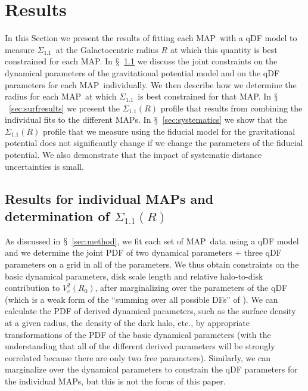 \documentclass{emulateapj}
\newcommand{\sectionname}{$\mathsection$}
\newcommand{\map}{MAP}
\newcommand{\sigoneone}{\ensuremath{\Sigma_{1.1}}}
\begin{document}
\section{Results}\label{sec:results}

In this Section we present the results of fitting each \map\ with a
qDF model to measure \sigoneone\ at the Galactocentric radius $R$ at
which this quantity is best constrained for each \map. In
\sectionname~\ref{sec:indivresults} we discuss the joint constraints
on the dynamical parameters of the gravitational potential model and
on the qDF parameters for each \map\ individually. We then describe
how we determine the radius for each \map\ at which \sigoneone\ is
best constrained for that \map. In \sectionname~\ref{sec:surfresults}
we present the $\sigoneone(R)$ profile that results from combining the
individual fits to the different \map s. In
\sectionname~\ref{sec:systematics} we show that the $\sigoneone(R)$
profile that we measure using the fiducial model for the gravitational
potential does not significantly change if we change the parameters of
the fiducial potential. We also demonstrate that the impact of
systematic distance uncertainties is small.

\subsection{Results for individual \map s and determination of $\Sigma_{1.1}(R)$}\label{sec:indivresults}

As discussed in \sectionname~\ref{sec:method}, we fit each set of
\map\ data using a qDF model and we determine the joint PDF of two
dynamical parameters + three qDF parameters on a grid in all of the
parameters. We thus obtain constraints on the basic dynamical
parameters, disk scale length and relative halo-to-disk contribution
to $V_c^2(R_0)$, after marginalizing over the parameters of the qDF
(which is a weak form of the ``summing over all possible DFs'' of
\citet{Magorrian06a}). We can calculate the PDF of derived dynamical
parameters, such as the surface density at a given radius, the density
of the dark halo, etc., by appropriate transformations of the PDF of
the basic dynamical parameters (with the understanding that all of the
different derived parameters will be strongly correlated because there
are only two free parameters). Similarly, we can marginalize over the
dynamical parameters to constrain the qDF parameters for the
individual \map s, but this is not the focus of this paper.
\end{document}
